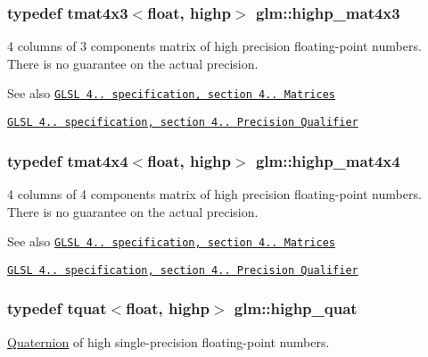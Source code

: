 \subsubsection[{highp\+\_\+mat4x3}]{\setlength{\rightskip}{0pt plus 5cm}typedef tmat4x3$<$float, highp$>$ {\bf glm\+::highp\+\_\+mat4x3}}\label{namespaceglm_a0debb266459f3bd097d3f7b3651b473e}
4 columns of 3 components matrix of high precision floating-\/point numbers. There is no guarantee on the actual precision.

\begin{DoxySeeAlso}{See also}
\href{http://www.opengl.org/registry/doc/GLSLangSpec.4.20.8.pdf}{\tt G\+L\+S\+L 4.. specification, section 4.. Matrices} 

\href{http://www.opengl.org/registry/doc/GLSLangSpec.4.20.8.pdf}{\tt G\+L\+S\+L 4.. specification, section 4.. Precision Qualifier} 
\end{DoxySeeAlso}
\hypertarget{namespaceglm_a41d9d374f7dddfb5fa0eccdf09c3eb21}{}
\subsubsection[{highp\+\_\+mat4x4}]{\setlength{\rightskip}{0pt plus 5cm}typedef tmat4x4$<$float, highp$>$ {\bf glm\+::highp\+\_\+mat4x4}}\label{namespaceglm_a41d9d374f7dddfb5fa0eccdf09c3eb21}
4 columns of 4 components matrix of high precision floating-\/point numbers. There is no guarantee on the actual precision.

\begin{DoxySeeAlso}{See also}
\href{http://www.opengl.org/registry/doc/GLSLangSpec.4.20.8.pdf}{\tt G\+L\+S\+L 4.. specification, section 4.. Matrices} 

\href{http://www.opengl.org/registry/doc/GLSLangSpec.4.20.8.pdf}{\tt G\+L\+S\+L 4.. specification, section 4.. Precision Qualifier} 
\end{DoxySeeAlso}
\hypertarget{namespaceglm_afc8001868f5332316cf2c9f68988d902}{}
\subsubsection[{highp\+\_\+quat}]{\setlength{\rightskip}{0pt plus 5cm}typedef {\bf tquat}$<$float, highp$>$ {\bf glm\+::highp\+\_\+quat}}\label{namespaceglm_afc8001868f5332316cf2c9f68988d902}
\hyperlink{class_quaternion}{Quaternion} of high single-\/precision floating-\/point numbers.

